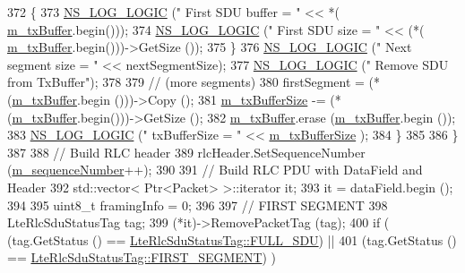 \begin{DoxyCode}
372             \{
373               \hyperlink{group__logging_ga88acd260151caf2db9c0fc84997f45ce}{NS\_LOG\_LOGIC} (\textcolor{stringliteral}{"        First SDU buffer  = "} << *(
      \hyperlink{classns3_1_1LteRlcUmLowLat_aaeef0eed7788f26d7564a84a0c546f74}{m\_txBuffer}.begin()));
374               \hyperlink{group__logging_ga88acd260151caf2db9c0fc84997f45ce}{NS\_LOG\_LOGIC} (\textcolor{stringliteral}{"        First SDU size    = "} << (*(
      \hyperlink{classns3_1_1LteRlcUmLowLat_aaeef0eed7788f26d7564a84a0c546f74}{m\_txBuffer}.begin()))->GetSize ());
375             \}
376           \hyperlink{group__logging_ga88acd260151caf2db9c0fc84997f45ce}{NS\_LOG\_LOGIC} (\textcolor{stringliteral}{"        Next segment size = "} << nextSegmentSize);
377           \hyperlink{group__logging_ga88acd260151caf2db9c0fc84997f45ce}{NS\_LOG\_LOGIC} (\textcolor{stringliteral}{"        Remove SDU from TxBuffer"});
378 
379           \textcolor{comment}{// (more segments)}
380           firstSegment = (*(\hyperlink{classns3_1_1LteRlcUmLowLat_aaeef0eed7788f26d7564a84a0c546f74}{m\_txBuffer}.begin ()))->Copy ();
381           \hyperlink{classns3_1_1LteRlcUmLowLat_a730b3933118b7d511e4aedab828e07aa}{m\_txBufferSize} -= (*(\hyperlink{classns3_1_1LteRlcUmLowLat_aaeef0eed7788f26d7564a84a0c546f74}{m\_txBuffer}.begin()))->GetSize ();
382           \hyperlink{classns3_1_1LteRlcUmLowLat_aaeef0eed7788f26d7564a84a0c546f74}{m\_txBuffer}.erase (\hyperlink{classns3_1_1LteRlcUmLowLat_aaeef0eed7788f26d7564a84a0c546f74}{m\_txBuffer}.begin ());
383           \hyperlink{group__logging_ga88acd260151caf2db9c0fc84997f45ce}{NS\_LOG\_LOGIC} (\textcolor{stringliteral}{"        txBufferSize = "} << \hyperlink{classns3_1_1LteRlcUmLowLat_a730b3933118b7d511e4aedab828e07aa}{m\_txBufferSize} );
384         \}
385 
386     \}
387 
388   \textcolor{comment}{// Build RLC header}
389   rlcHeader.SetSequenceNumber (\hyperlink{classns3_1_1LteRlcUmLowLat_a64748d117e359174d33d3d9b26663698}{m\_sequenceNumber}++);
390 
391   \textcolor{comment}{// Build RLC PDU with DataField and Header}
392   std::vector< Ptr<Packet> >::iterator it;
393   it = dataField.begin ();
394 
395   uint8\_t framingInfo = 0;
396 
397   \textcolor{comment}{// FIRST SEGMENT}
398   LteRlcSduStatusTag tag;
399   (*it)->RemovePacketTag (tag);
400   \textcolor{keywordflow}{if} ( (tag.GetStatus () == \hyperlink{classns3_1_1LteRlcSduStatusTag_ae7822c5cc0d54a3d193b09a91ed6f133ade41b0025c66cd211e992196f314d4a5}{LteRlcSduStatusTag::FULL\_SDU}) ||
401         (tag.GetStatus () == \hyperlink{classns3_1_1LteRlcSduStatusTag_ae7822c5cc0d54a3d193b09a91ed6f133afda65e6233ba6fd1cd8aacf54cd11269}{LteRlcSduStatusTag::FIRST\_SEGMENT}) )

\end{DoxyCode}
